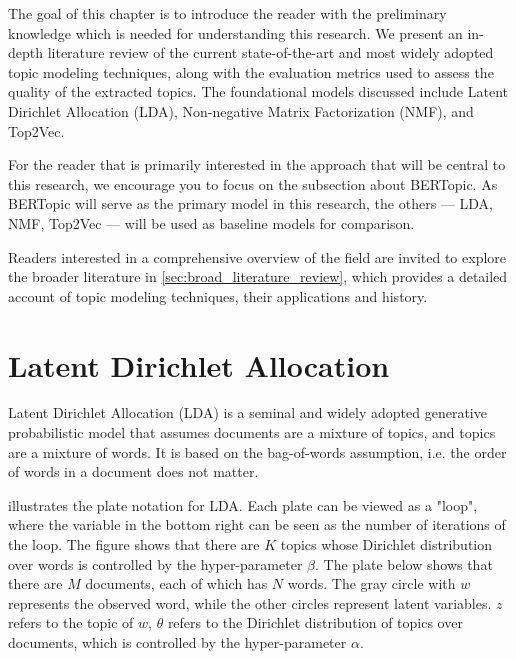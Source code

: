 The goal of this chapter is to introduce the reader with the preliminary knowledge which is needed for understanding this research. We present an in-depth literature review of the current state-of-the-art and most widely adopted topic modeling techniques, along with the evaluation metrics used to assess the quality of the extracted topics. The foundational models discussed include Latent Dirichlet Allocation (LDA), Non-negative Matrix Factorization (NMF), and Top2Vec.

For the reader that is primarily interested in the approach that will be central to this research, we encourage you to focus on the subsection about BERTopic. As BERTopic will serve as the primary model in this research, the others — LDA, NMF, Top2Vec — will be used as baseline models for comparison.

Readers interested in a comprehensive overview of the field are invited to explore the broader literature in \cref{sec:broad_literature_review}, which provides a detailed account of topic modeling techniques, their applications and history.

\section{Latent Dirichlet Allocation}
Latent Dirichlet Allocation (LDA) \cite{blei_latent_2001} is a seminal and widely adopted generative probabilistic model that assumes documents are a mixture of topics, and topics are a mixture of words. It is based on the bag-of-words assumption, i.e. the order of words in a document does not matter.

 illustrates the plate notation for LDA. Each plate can be viewed as a "loop", where the variable in the bottom right can be seen as the number of iterations of the loop. The figure shows that there are $K$ topics whose Dirichlet distribution over words is controlled by the hyper-parameter $\beta$. The plate below shows that there are $M$ documents, each of which has $N$ words. The gray circle with $w$ represents the observed word, while the other circles represent latent variables. $z$ refers to the topic of $w$, $\theta$ refers to the Dirichlet distribution of topics over documents, which is controlled by the hyper-parameter $\alpha$.

